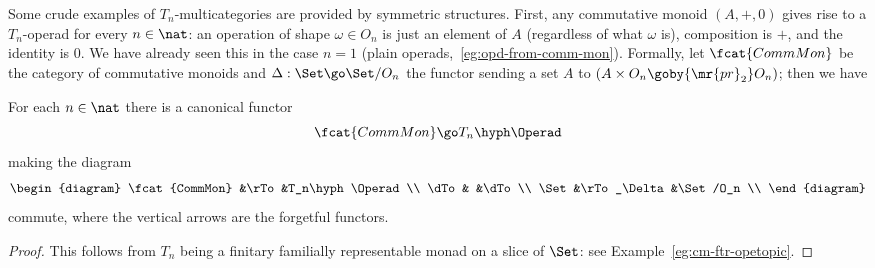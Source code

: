 Some crude examples of $T_n$-multicategories are provided by symmetric
structures.  First, any commutative%
%
%
monoid $(A,+,0)$ gives rise to a
$T_n$-operad for every $n\in\nat$: an operation of shape $\omega\in O_n$ is
just an element of $A$ (regardless of what $\omega$ is), composition is
$+$, and the identity is $0$.  We have already seen this in the case $n=1$
(plain operads,~\ref{eg:opd-from-comm-mon}).  Formally, let
$\fcat{CommMon}$%
% 
% 
be the category of commutative monoids and $\Delta: \Set
\go \Set/O_n$%
% 
% 
the functor sending a set $A$ to $(A \times O_n
\goby{\mr{pr}_2} O_n)$; then we have
%
\begin{thm}	
For each $n\in\nat$ there is a canonical functor
\[
\fcat{CommMon} \go T_n\hyph\Operad
\]
making the diagram
\[
\begin{diagram}
\fcat{CommMon}	&\rTo		&T_n\hyph\Operad	\\
\dTo		&		&\dTo			\\
\Set		&\rTo_\Delta	&\Set/O_n		\\
\end{diagram}
\]
commute, where the vertical arrows are the forgetful functors. 
\end{thm}
%
\begin{proof}
This follows from $T_n$ being a finitary familially representable monad on
a slice of $\Set$: see Example~\ref{eg:cm-ftr-opetopic}.
\done
\end{proof}

